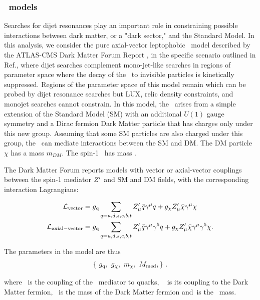 \clearpage

\subsubsection{\Zprime\ models}
\label{sec:Zprime}

Searches for dijet resonances play an important role in constraining
possible interactions between dark matter, or a "dark sector," and the
Standard Model. In this analysis, we consider the pure axial-vector
leptophobic \Zprime\ model described by the ATLAS-CMS Dark Matter Forum
Report \cite{Abercrombie:2015wmb}, in the specific scenario outlined in Ref.\cite{Chala:2015ama}, 
where dijet searches complement mono-jet-like searches in regions of
parameter space where the decay of the \Zprime\ to invisible particles is
kinetically suppressed. Regions of the parameter space of this model
remain which can be probed by dijet resonance searches but LUX, relic
density constraints, and monojet searches cannot constrain.
% 
In this model, the \Zprime\ arises from a simple extension of the Standard
Model (SM) with an additional $U(1)$ gauge symmetry and a Dirac
fermion Dark Matter particle that has charges only under this new
group. Assuming that some SM particles are also charged under this
group, the \Zprime\ can mediate interactions between the SM and DM. The DM
particle $\chi$ has a mass $m_{DM}$. The spin-1 \Zprime\ has mass \mMed.

The Dark Matter Forum reports models with vector or axial-vector couplings
between the spin-1 mediator $Z^\prime$ and SM and DM fields, with the corresponding interaction Lagrangians:

\begin{align}
	\label{eq:AV}
	\mathcal{L}_{\mathrm{vector}} &= g_{\mathrm q} \sum_{q={u,d,s,c,b,t}}  Z^\prime_{\mu} \bar{q}\gamma^{\mu}q + g_{\chi} Z^\prime_{\mu} \bar{\chi}\gamma^{\mu}\chi \\
	\mathcal{L}_{\mathrm{axial-vector}} &= g_{\mathrm q} \sum_{q={u,d,s,c,b,t}}  Z^\prime_{\mu} \bar{q}\gamma^{\mu}\gamma^5q + g_{\chi} Z^\prime_{\mu} \bar{\chi}\gamma^{\mu}\gamma^5\chi.
\end{align}

The parameters in the model are thus
\begin{equation}
\left\{~g_{\mathrm q}, 
~ g_{\chi}, 
~m_{\chi},
~M_{\mathrm{med}},
\right\} \,.
\end{equation}

where ~\gq is the coupling of the \Zprime\ mediator to quarks, ~ \gDM
is its coupling to the Dark Matter fermion, ~\mDM is the mass
of the Dark Matter fermion and~\mMed is the \Zprime\ mass. 

